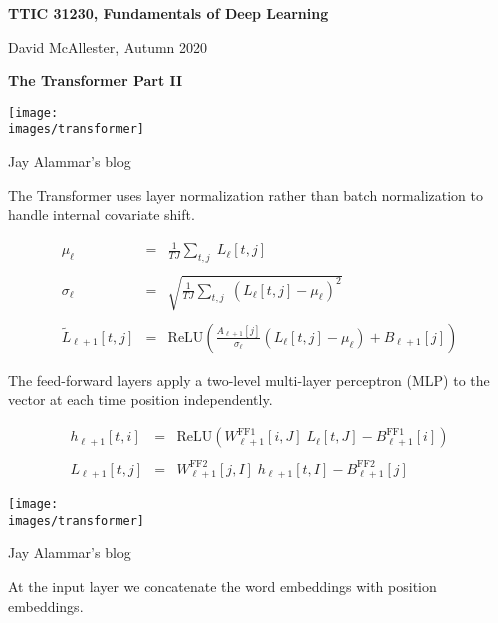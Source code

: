 




{\Huge
  \centerline{\bf TTIC 31230,  Fundamentals of Deep Learning}
  \vfill
  \centerline{David McAllester, Autumn 2020}
  \vfill
  \centerline{\bf  The Transformer Part II}
  \vfill
  \vfill


\centerline{\texttt{[image: \\images/transformer]}}

{\Large
\centerline{Jay Alammar's blog}
}


The Transformer uses layer normalization rather than batch normalization to handle internal covariate shift.

\vfill
\begin{eqnarray*}
  \mu_\ell & = & \frac{1}{TJ} \sum_{t,j} \;L_\ell[t,j] \\
  \\
  \sigma_{\ell} & = & \sqrt{\frac{1}{TJ} \sum_{t,j}\;(L_\ell[t,j] - \mu_\ell)^2} \\
  \\
  \tilde{L}_{\ell+1}[t,j] & = & \mathrm{ReLU}\left(\frac{A_{\ell+1}[j]}{\sigma_\ell}(L_\ell[t,j] -\mu_\ell) + B_{\ell+1}[j]\right)
\end{eqnarray*}


The feed-forward layers apply a two-level multi-layer perceptron (MLP) to the vector at each time position independently.

\vfill

\begin{eqnarray*}
h_{\ell+1}[t,i] & = & \mathrm{ReLU}(W^{\mathrm{FF1}}_{\ell+1}[i,J]\;L_\ell[t,J] - B^{\mathrm{FF1}}_{\ell+1}[i]) \\
\\
L_{\ell+1}[t,j] & = & W^{\mathrm{FF2}}_{\ell+1}[j,I]\;h_{\ell+1}[t,I] - B^\mathrm{FF2}_{\ell+1}[j]
\end{eqnarray*}


\centerline{\texttt{[image: \\images/transformer]}}

{\huge
\centerline{Jay Alammar's blog}
}


At the input layer we concatenate the word embeddings with position embeddings.

}
